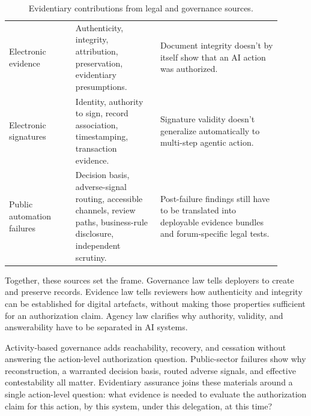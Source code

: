\begin{table}[tbp]
\begin{tabular}{>{\raggedright\arraybackslash}p{0.22\linewidth}%
                >{\raggedright\arraybackslash}p{0.28\linewidth}%
                >{\raggedright\arraybackslash}p{0.40\linewidth}}
Electronic evidence & Authenticity, integrity, attribution, preservation, evidentiary presumptions. & Document integrity doesn't by itself show that an AI action was authorized. \\
Electronic signatures & Identity, authority to sign, record association, timestamping, transaction evidence. & Signature validity doesn't generalize automatically to multi-step agentic action. \\
Public automation failures & Decision basis, adverse-signal routing, accessible channels, review paths, business-rule disclosure, independent scrutiny. & Post-failure findings still have to be translated into deployable evidence bundles and forum-specific legal tests. \\
\bottomrule
\end{tabular}
\caption{Evidentiary contributions from legal and governance sources.}
\label{tab:legal-governance-primitives}
\end{table}

Together, these sources set the frame. Governance law tells deployers to create and preserve records. Evidence law tells reviewers how authenticity and integrity can be established for digital artefacts, without making those properties sufficient for an authorization claim. Agency law clarifies why authority, validity, and answerability have to be separated in AI systems.

Activity-based governance adds reachability, recovery, and cessation without answering the action-level authorization question. Public-sector failures show why reconstruction, a warranted decision basis, routed adverse signals, and effective contestability all matter. Evidentiary assurance joins these materials around a single action-level question: what evidence is needed to evaluate the authorization claim for this action, by this system, under this delegation, at this time?
